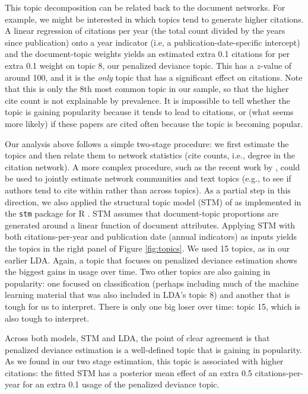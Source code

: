 \documentclass[12pt]{article}
\begin{document}
This topic decomposition can be related back to the document networks.  For example, we might be interested in which topics tend to generate higher citations.  A linear regression of citations per year (the total count divided by the years since publication) onto a year indicator (i.e, a publication-date-specific intercept) and the document-topic weights yields an estimated extra 0.1 citations for  per extra 0.1 weight  on topic 8, our penalized deviance topic. This has a $z$-value of around 100, and it is the {\it only} topic that has a significant effect on citations.   Note that this is only the 8th most common topic in our sample, so that the higher cite count is not explainable by prevalence.  It is impossible to tell whether the topic is gaining popularity because it tends to lead to citations, or (what seems more likely) if these papers are cited often because the topic is becoming popular.

Our analysis above follows a simple two-stage procedure: we first estimate the topics and then relate them to network statistics (cite counts, i.e., degree in the citation network).
A more complex procedure, such as the recent work by \cite{TanChanZheng2015}, could be used to jointly estimate network communities and text topics (e.g., to see if authors tend to cite within rather than across topics).  As a partial step in this direction, we also applied the structural topic model (STM) of \cite{roberts2013structural} as implemented in the {\tt stm} package for R \citep{roberts2014stm}.  STM assumes that document-topic proportions are generated around a linear function of document attributes.  Applying STM with both citations-per-year and publication date (annual indicators) as inputs yields the topics in the right panel of Figure \ref{fig:topics}.  We  used 15 topics, as in our earlier LDA.  Again, a topic that focuses on penalized deviance estimation shows the biggest gains in usage over time.  Two other topics are also gaining in popularity: one focused on classification (perhaps including much of the machine learning material that was also included in LDA's topic 8) and another that is tough for us to interpret.  There is only one big loser over time: topic 15, which is also tough to interpret.  

Across both models, STM and LDA, the point of clear agreement is that penalized deviance estimation is a well-defined topic that is gaining in popularity.  As we found in our two stage estimation, this topic is associated with higher citations: the fitted STM has a posterior mean effect of an extra 0.5 citations-per-year for an extra 0.1 usage of the penalized deviance topic.
\end{document}
